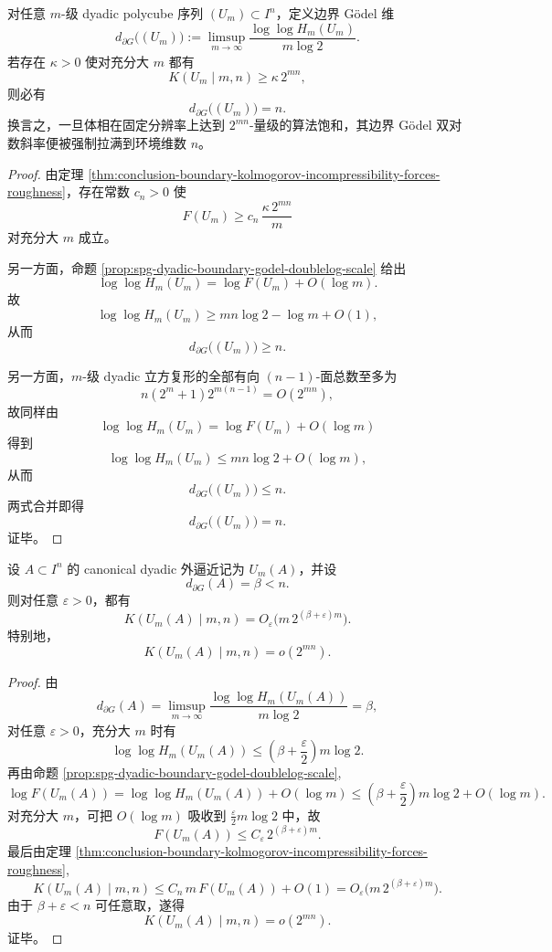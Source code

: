 \begin{theorem}\label{thm:conclusion-boundary-kolmogorov-saturation-forces-godel-saturation}
对任意 \(m\)-级 dyadic polycube 序列 \((U_m)\subset I^n\)，定义边界 Gödel 维
\[
d_{\partial G}\bigl((U_m)\bigr)
:=
\limsup_{m\to\infty}
\frac{\log\log H_m(U_m)}{m\log 2}.
\]
若存在 \(\kappa>0\) 使对充分大 \(m\) 都有
\[
K(U_m\mid m,n)\ge \kappa\,2^{mn},
\]
则必有
\[
d_{\partial G}\bigl((U_m)\bigr)=n.
\]
换言之，一旦体相在固定分辨率上达到 \(2^{mn}\)-量级的算法饱和，其边界 Gödel 双对数斜率便被强制拉满到环境维数 \(n\)。
\end{theorem}
\begin{proof}
由定理 \ref{thm:conclusion-boundary-kolmogorov-incompressibility-forces-roughness}，存在常数 \(c_n>0\) 使
\[
F(U_m)\ge c_n\,\frac{\kappa\,2^{mn}}{m}
\]
对充分大 \(m\) 成立。

另一方面，命题 \ref{prop:spg-dyadic-boundary-godel-doublelog-scale} 给出
\[
\log\log H_m(U_m)=\log F(U_m)+O(\log m).
\]
故
\[
\log\log H_m(U_m)
\ge
mn\log 2-\log m+O(1),
\]
从而
\[
d_{\partial G}\bigl((U_m)\bigr)\ge n.
\]

另一方面，\(m\)-级 dyadic 立方复形的全部有向 \((n-1)\)-面总数至多为
\[
n(2^m+1)2^{m(n-1)}=O(2^{mn}),
\]
故同样由
\[
\log\log H_m(U_m)=\log F(U_m)+O(\log m)
\]
得到
\[
\log\log H_m(U_m)\le mn\log 2+O(\log m),
\]
从而
\[
d_{\partial G}\bigl((U_m)\bigr)\le n.
\]
两式合并即得
\[
d_{\partial G}\bigl((U_m)\bigr)=n.
\]
证毕。
\end{proof}

\begin{corollary}\label{cor:conclusion-submaximal-boundary-godel-dimension-excludes-kolmogorov-saturation}
设 \(A\subset I^n\) 的 canonical dyadic 外逼近记为 \(U_m(A)\)，并设
\[
d_{\partial G}(A)=\beta<n.
\]
则对任意 \(\varepsilon>0\)，都有
\[
K(U_m(A)\mid m,n)=O_\varepsilon\!\bigl(m\,2^{(\beta+\varepsilon)m}\bigr).
\]
特别地，
\[
K(U_m(A)\mid m,n)=o(2^{mn}).
\]
\end{corollary}
\begin{proof}
由
\[
d_{\partial G}(A)
=
\limsup_{m\to\infty}
\frac{\log\log H_m(U_m(A))}{m\log 2}
=
\beta,
\]
对任意 \(\varepsilon>0\)，充分大 \(m\) 时有
\[
\log\log H_m(U_m(A))
\le
\left(\beta+\frac{\varepsilon}{2}\right)m\log 2.
\]
再由命题 \ref{prop:spg-dyadic-boundary-godel-doublelog-scale},
\[
\log F(U_m(A))
=
\log\log H_m(U_m(A))+O(\log m)
\le
\left(\beta+\frac{\varepsilon}{2}\right)m\log 2+O(\log m).
\]
对充分大 \(m\)，可把 \(O(\log m)\) 吸收到 \(\frac{\varepsilon}{2}m\log 2\) 中，故
\[
F(U_m(A))\le C_\varepsilon\,2^{(\beta+\varepsilon)m}.
\]
最后由定理 \ref{thm:conclusion-boundary-kolmogorov-incompressibility-forces-roughness},
\[
K(U_m(A)\mid m,n)\le C_n\,m\,F(U_m(A))+O(1)
=
O_\varepsilon\!\bigl(m\,2^{(\beta+\varepsilon)m}\bigr).
\]
由于 \(\beta+\varepsilon<n\) 可任意取，遂得
\[
K(U_m(A)\mid m,n)=o(2^{mn}).
\]
证毕。
\end{proof}

